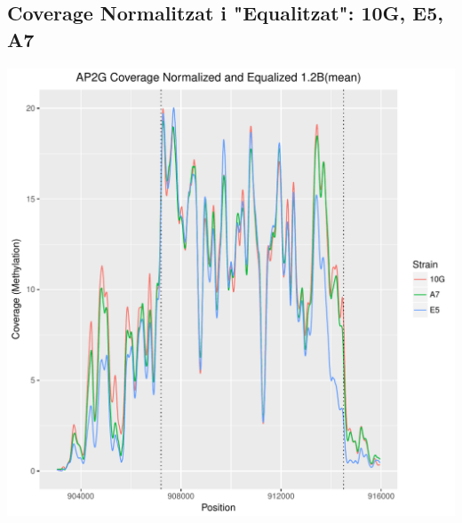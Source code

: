 \documentclass{article}\usepackage[]{graphicx}\usepackage[]{color}
\newenvironment{knitrout}{}{} %
\begin{document}
\subsection{Coverage Normalitzat i "Equalitzat": 10G, E5, A7}
\begin{knitrout}
\color{fgcolor}
\includegraphics[width=1\linewidth]{figure/plot_NromequalizedCov_3sample-1} 

\end{knitrout}
\clearpage
\end{document}
